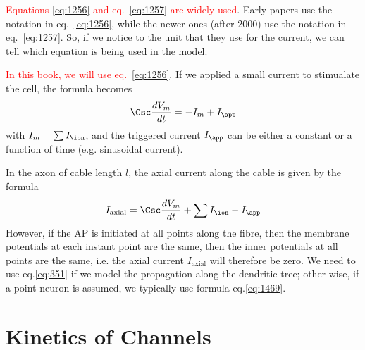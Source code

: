 \begin{mdframed}
\textcolor{red}{Equations \eqref{eq:1256} and eq.~\eqref{eq:1257} are widely
used}. Early papers use the notation in eq.~\eqref{eq:1256}, while the newer
ones (after 2000) use the notation in eq.~\eqref{eq:1257}. So, if we notice to
the unit that they use for the current, we can tell which equation is being used
in the model.

\textcolor{red}{In this book, we will use eq.~\eqref{eq:1256}}. If we applied a
small current to stimualate the cell, the formula becomes
\begin{equation}
\label{eq:1469}
  \Csc \frac{dV_m}{dt} = -I_m + I_\app
\end{equation}
with $I_m= \sum I_\ion$, and the triggered current $I_\app$ can be either a
constant or a function of time (e.g. sinusoidal current).
\end{mdframed}

In the axon of cable length $l$, the axial current along the cable is given by
the formula
\begin{equation}
  \label{eq:351}
  I_\text{axial} = \Csc\frac{dV_m}{dt} + \sum I_\ion - I_\app
\end{equation}
However, if the
AP is initiated at all points along the fibre, then the membrane potentials at
each instant point are the same, then the inner potentials at all points are the
same, i.e. the axial current $I_\text{axial}$ will therefore be zero.
We need to use eq.\ref{eq:351} if we model the propagation along the
dendritic tree; other wise, if a point neuron is assumed, we
typically use formula eq.\ref{eq:1469}.





\chapter{Kinetics of Channels}
\label{chap:kinetics-channels}

\def\gate{{\text{gate}}}
\def\shut{{\text{shut}}}
\def\open{{\text{open}}}
\def\rise{{\text{rise}}}
\def\decay{{\text{decay}}}
\def\ms{{\text{ms}}}

